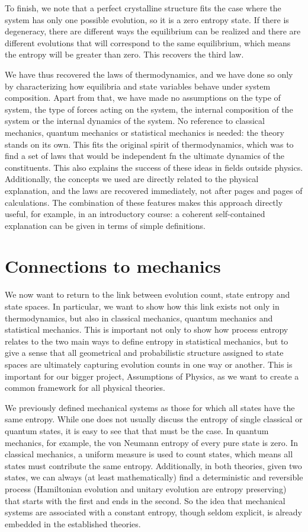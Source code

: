 \documentclass[letterpaper,twocolumn]{article}
\begin{document}
To finish, we note that a perfect crystalline structure fits the case where the system has only one possible evolution, so it is a zero entropy state. If there is degeneracy, there are different ways the equilibrium can be realized and there are different evolutions that will correspond to the same equilibrium, which means the entropy will be greater than zero. This recovers the third law.

We have thus recovered the laws of thermodynamics, and we have done so only by characterizing how equilibria and state variables behave under system composition. Apart from that, we have made no assumptions on the type of system, the type of forces acting on the system, the internal composition of the system or the internal dynamics of the system. No reference to classical mechanics, quantum mechanics or statistical mechanics is needed: the theory stands on its own. This fits the original spirit of thermodynamics, which was to find a set of laws that would be independent fn the ultimate dynamics of the constituents. This also explains the success of these ideas in fields outside physics. Additionally, the concepts we used are directly related to the physical explanation, and the laws are recovered immediately, not after pages and pages of calculations. The combination of these features makes this approach directly useful, for example, in an introductory  course: a coherent self-contained explanation can be given in terms of simple definitions.

\section{Connections to mechanics}\label{sec_mechanics}

We now want to return to the link between evolution count, state entropy and state spaces. In particular, we want to show how this link exists not only in thermodynamics, but also in classical mechanics, quantum mechanics and statistical mechanics. This is important not only to show how process entropy relates to the two main ways to define entropy in statistical mechanics, but to give a sense that all geometrical and probabilistic structure assigned to state spaces are ultimately capturing evolution counts in one way or another. This is important for our bigger project, Assumptions of Physics, as we want to create a common framework for all physical theories.

We previously defined mechanical systems as those for which all states have the same entropy. While one does not usually discuss the entropy of single classical or quantum states, it is easy to see that that must be the case. In quantum mechanics, for example, the von Neumann entropy of every pure state is zero. In classical mechanics, a uniform measure is used to count states, which means all states must contribute the same entropy. Additionally, in both theories, given two states, we can always (at least mathematically) find a deterministic and reversible process (Hamiltonian evolution and unitary evolution are entropy preserving) that starts with the first and ends in the second. So the idea that mechanical systems are associated with a constant entropy, though seldom explicit, is already embedded in the established theories.
\end{document}
